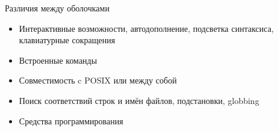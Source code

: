 \begin{frame}[fragile]{Различия между оболочками}
  \begin{itemize}
    \item Интерактивные возможности,  автодополнение, подсветка синтаксиса, клавиатурные сокращения
    \item Встроенные команды 
    \item Совместимость c POSIX или между собой
    \item Поиск соответствий строк и имён файлов, подстановки, globbing
    \item Средства программирования
\end{itemize}
\end{frame}
